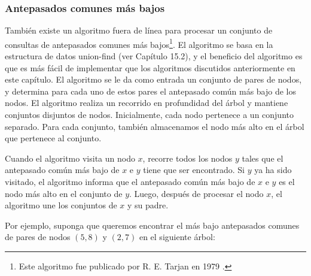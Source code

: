 \subsubsection{Antepasados comunes más bajos}

También existe un algoritmo fuera de línea
para procesar un conjunto de
consultas de antepasados comunes más bajos\footnote{Este
algoritmo fue publicado por R. E. Tarjan en 1979 \cite{tar79}.}.
El algoritmo se basa en la estructura de datos union-find
(ver Capítulo 15.2), y el beneficio del algoritmo es
que es más fácil de implementar que
los algoritmos discutidos anteriormente en este capítulo.
El algoritmo se le da como entrada un conjunto de pares de nodos,
y determina para cada uno de estos pares el
antepasado común más bajo de los nodos.
El algoritmo realiza un recorrido en profundidad del árbol
y mantiene conjuntos disjuntos de nodos.
Inicialmente, cada nodo pertenece a un conjunto separado.
Para cada conjunto, también almacenamos el nodo más alto en el
árbol que pertenece al conjunto.

Cuando el algoritmo visita un nodo $x$,
recorre todos los nodos $y$ tales que
el antepasado común más bajo de $x$ e $y$
tiene que ser encontrado.
Si $y$ ya ha sido visitado,
el algoritmo informa que el
antepasado común más bajo de $x$ e $y$
es el nodo más alto en el conjunto de $y$.
Luego, después de procesar el nodo $x$,
el algoritmo une los conjuntos de $x$ y su padre.

Por ejemplo, suponga que queremos encontrar el más bajo
antepasados comunes de pares de nodos $(5,8)$
y $(2,7)$ en el siguiente árbol:
\begin{center}
\end{center}

